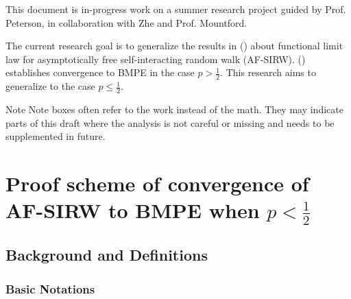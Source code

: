 


This document is in-progress work on a summer research project guided by Prof. Peterson, in collaboration with Zhe and Prof. Mountford.

The current research goal is to generalize the results in (\cite{kosyginaConvergenceNonconvergenceScaled2022}) about functional limit law for asymptotically free self-interacting random walk (AF-SIRW). (\cite{kosyginaConvergenceNonconvergenceScaled2022}) establishes convergence to BMPE in the case $p > \frac{1}{2}$. This research aims to generalize to the case  $p \le \frac{1}{2}$.

\begin{note}{Note}
	Note boxes often refer to the work instead of the math. They may indicate parts of this draft where the analysis is not careful or missing and needs to be supplemented in future.
\end{note}

\section{Proof scheme of convergence of AF-SIRW to BMPE when $p < \frac{1}{2}$}

\subsection{Background and Definitions}

\subsubsection{Basic Notations}

